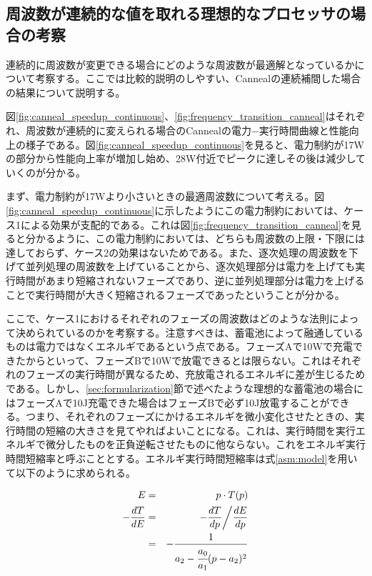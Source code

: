\subsection{周波数が連続的な値を取れる理想的なプロセッサの場合の考察}
\label{subsec:continuous}


連続的に周波数が変更できる場合にどのような周波数が最適解となっているかについて考察する。ここでは比較的説明のしやすい、Cannealの連続補間した場合の結果について説明する。

図\ref{fig:canneal_speedup_continuous}、\ref{fig:frequency_transition_canneal}はそれぞれ、周波数が連続的に変えられる場合のCannealの電力−実行時間曲線と性能向上の様子である。図\ref{fig:canneal_speedup_continuous}を見ると、電力制約が17Wの部分から性能向上率が増加し始め、28W付近でピークに達しその後は減少していくのが分かる。

まず、電力制約が17Wより小さいときの最適周波数について考える。図\ref{fig:canneal_speedup_continuous}に示したようにこの電力制約においては、ケース1による効果が支配的である。これは図\ref{fig:frequency_transition_canneal}を見ると分かるように、この電力制約においては、どちらも周波数の上限・下限には達しておらず、ケース2の効果はないためである。また、逐次処理の周波数を下げて並列処理の周波数を上げていることから、逐次処理部分は電力を上げても実行時間があまり短縮されないフェーズであり、逆に並列処理部分は電力を上げることで実行時間が大きく短縮されるフェーズであったということが分かる。

ここで、ケース1におけるそれぞれのフェーズの周波数はどのような法則によって決められているのかを考察する。注意すべきは、蓄電池によって融通しているものは電力ではなくエネルギであるという点である。フェーズAで10Wで充電できたからといって、フェーズBで10Wで放電できるとは限らない。これはそれぞれのフェーズの実行時間が異なるため、充放電されるエネルギに差が生じるためである。しかし、\ref{sec:formularization}節で述べたような理想的な蓄電池の場合にはフェーズAで10J充電できた場合はフェーズBで必ず10J放電することができる。つまり、それぞれのフェーズにかけるエネルギを微小変化させたときの、実行時間の短縮の大きさを見てやればよいことになる。これは、実行時間を実行エネルギで微分したものを正負逆転させたものに他ならない。これをエネルギ実行時間短縮率と呼ぶこととする。エネルギ実行時間短縮率は式\ref{asm:model}を用いて以下のように求められる。

\begin{eqnarray}
E &=& p \cdot T(p)\\
-\frac{dT}{dE} &=& -\frac{dT}{dp} \bigg/ \frac{dE}{dp}\\
&=& -\frac{1}{a_2 - \cfrac{a_0}{a_1}( p-a_2)^2} \label{asm:differential}
\end{eqnarray}

